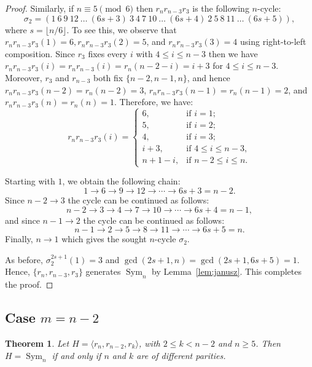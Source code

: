 \documentclass[
final
]{dmtcs-episciences}
\newtheorem{theorem}{Theorem}
\DeclareMathOperator{\Sym}{\mathrm{Sym}}
\begin{document}
\begin{proof}
Similarly, if $n\equiv 5\pmod 6$ then $r_nr_{n-3}r_{3}$ is the following $n$-cycle:
    \[
    \sigma_2=(1\ 6\ 9\ 12 \ \ldots \ (6s+3)\ 3\ 4 \ 7 \ 10 \ \ldots \ (6s+4)\ 2\ 5\ 8\ 11 \ \ldots \ (6s+5)),
    \] where $s=\lfloor{n/6}\rfloor$. To see this, we observe that $r_nr_{n-3}r_3(1)=6, r_nr_{n-3}r_3(2)=5$, and $r_nr_{n-3}r_3(3)=4$ using right-to-left composition. Since $r_3$ fixes every $i$ with $4\leqslant i\leqslant n-3$ then we have $r_nr_{n-3}r_3(i)=r_nr_{n-3}(i)=r_n(n-2-i)=i+3$ for $4\leqslant i\leqslant n-3$. Moreover, $r_3$ and $r_{n-3}$ both fix $\{n-2,n-1,n\}$, and hence $r_nr_{n-3}r_3(n-2)=r_n(n-2)=3$, $r_nr_{n-3}r_3(n-1)=r_n(n-1)=2$, and $r_nr_{n-3}r_3(n)=r_n(n)=1$. Therefore, we have:
\[
r_nr_{n-3}r_3(i)=
\begin{cases}
6, & \text{if }i=1;\\
5, & \text{if }i=2;\\
4, & \text{if }i=3;\\
i+3, & \text{if }4\leqslant i\leqslant n-3,\\
n+1-i, & \text{if }n-2\leqslant i\leqslant n.
\end{cases}
\]

Starting with \(1\), we obtain the following chain:
\[
1\rightarrow6\rightarrow9\rightarrow12
\rightarrow\cdots\rightarrow6s+3=n-2.
\]
Since \(n-2\rightarrow3\) the cycle can be continued as follows:
\[
n-2\rightarrow3\rightarrow4\rightarrow7
\rightarrow10\rightarrow\cdots
\rightarrow6s+4=n-1,
\]
and since \(n-1\rightarrow2\) the cycle can be continued as follows: 
\[
n-1\rightarrow2\rightarrow5\rightarrow8
\rightarrow11\rightarrow\cdots
\rightarrow6s+5=n.
\]
Finally, $n\rightarrow1$ which gives the sought $n$-cycle $\sigma_2$.

As before, $\sigma_2^{2s+1}(1)=3$ and $\gcd(2s+1,n)=\gcd(2s+1,6s+5)=1$. Hence, $\{r_n,r_{n-3},r_3\}$ generates $\Sym_n$ by Lemma~\ref{lem:janusz}. This completes the proof. 
\end{proof}


\subsection{Case $m=n-2$}\label{m=n-2}

\medskip

\begin{theorem}\label{thm:n-2}
Let $H=\langle r_n, r_{n-2}, r_k\rangle$, with $2\leqslant k < n-2$ and $n\geqslant 5$. Then $H=\Sym_n$ if and only if $n$ and $k$ are of different parities. 
\end{theorem}
\end{document}
